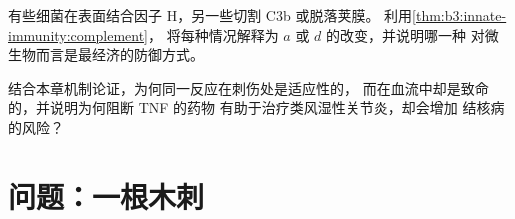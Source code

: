\begin{exercise}[$\star\star\star$]\label{exo:b3:innate-immunity:11}
有些细菌在表面结合因子 H，另一些切割 C3b 或脱落荚膜。
利用\cref{thm:b3:innate-immunity:complement}，
将每种情况解释为 $a$ 或 $d$ 的改变，并说明哪一种
对微生物而言是最经济的防御方式。
\end{exercise}

\begin{exercise}[$\star\star\star$]\label{exo:b3:innate-immunity:12}
结合本章机制论证，为何同一反应在刺伤处是适应性的，
而在血流中却是致命的，并说明为何阻断 TNF 的药物
有助于治疗类风湿性关节炎，却会增加
结核病的风险？
\end{exercise}

\section{问题：一根木刺}

